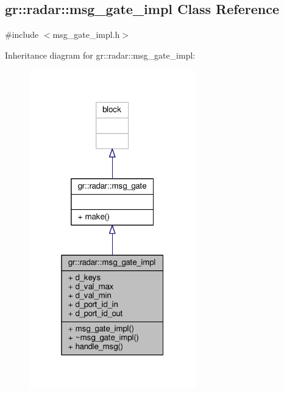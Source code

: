\subsection{gr\+:\+:radar\+:\+:msg\+\_\+gate\+\_\+impl Class Reference}
\label{classgr_1_1radar_1_1msg__gate__impl}


{\ttfamily \#include $<$msg\+\_\+gate\+\_\+impl.\+h$>$}



Inheritance diagram for gr\+:\+:radar\+:\+:msg\+\_\+gate\+\_\+impl\+:
\nopagebreak
\begin{figure}[H]
\begin{center}
\leavevmode
\includegraphics[width=205pt]{db/d8e/classgr_1_1radar_1_1msg__gate__impl__inherit__graph}
\end{center}
\end{figure}


